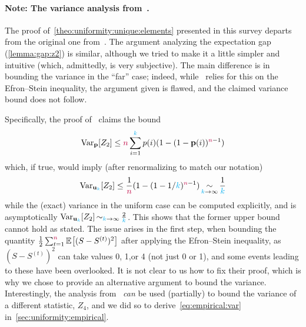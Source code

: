 \paragraph{Note: The variance analysis from~\citet{Paninski08}.}
The proof of~\cref{theo:uniformity:unique:elements} presented in this survey departs from the original one from~\citet{Paninski08}. The argument analyzing the expectation gap (\cref{lemma:gap:z2}) is similar, although we tried to make it a little simpler and intuitive (which, admittedly, is very subjective). The main difference is in bounding the variance in the ``far'' case; indeed, while~\citep{Paninski08} relies for this on the Efron--Stein inequality, the argument given is flawed, and the claimed variance bound does not follow.

Specifically, the proof of~\citet[Lemma~2]{Paninski08} claims the bound
\[
  \operatorname{Var}_{\mathbf{p}}[Z_2] \leq {\textcolor{purple}{n}} \sum_{i=1}^{\textcolor{cyan}{k}} p(i)(1-(1-\mathbf{p}(i))^{{\textcolor{purple}{n}}-1})
\]
which, if true, would imply (after renormalizing to match our notation)
\[
  \operatorname{Var}_{\mathbf{u}_{\textcolor{cyan}{k}}}[Z_2] \leq \frac{1}{{\textcolor{purple}{n}}}(1-(1-1/{\textcolor{cyan}{k}})^{{\textcolor{purple}{n}}-1}) \operatorname*{\sim}_{{\textcolor{cyan}{k}}\to \infty} \frac{1}{{\textcolor{cyan}{k}}}
\]
while the (exact) variance in the uniform case can be computed explicitly, and is asymptotically $\operatorname{Var}_{\mathbf{u}_{\textcolor{cyan}{k}}}[Z_2] \operatorname*{\sim}_{{\textcolor{cyan}{k}}\to \infty} \frac{2}{{\textcolor{cyan}{k}}}$. 
This shows that the former upper bound cannot hold as stated. The issue arises in the first step, when bounding 
the quantity $\frac{1}{2} \sum_{t=1}^\ns \bEE{(S-S^{(t)})^2}$ after applying the Efron--Stein inequality, as $(S-S^{(t)})^2$ can take values 0, 1,or 4 (not just 0 or 1), and some events leading to these have been overlooked. It is not clear to us how to fix their proof, which is why we chose to provide an alternative argument to bound the variance. Interestingly, the analysis from~\citet[Lemma~2]{Paninski08} \emph{can} be used (partially) to bound the variance of a different statistic, $Z_4$, and we did so to derive~\cref{eq:empirical:var} in~\cref{sec:uniformity:empirical}.

